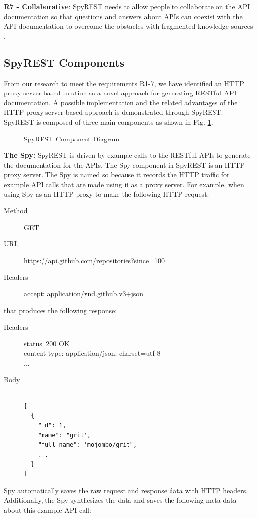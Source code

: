 \documentclass[conference]{IEEEtran}
\begin{document}
  \textbf{R7 - Collaborative}: SpyREST needs to allow people to collaborate on the API documentation so that questions and answers about APIs can coexist with the API documentation to overcome the obstacles with fragmented knowledge sources \cite{Chen_who_asked}.


\subsection{SpyREST Components} %
From our research to meet the requirements R1-7, we have identified an HTTP proxy server based solution as a novel approach for generating RESTful API documentation. A possible implementation and the related advantages of the HTTP proxy server based approach is demonstrated through SpyREST. SpyREST is composed of three main components as shown in Fig. \ref{fig:components}.

\begin{figure}[htb]
\centering
\def\svgwidth{\linewidth}

\caption{SpyREST Component Diagram}
\label{fig:components}
\end{figure}

\textbf{The Spy:} SpyREST is driven by example calls to the RESTful APIs to generate the documentation for the APIs. The Spy component in SpyREST is an HTTP proxy server. The Spy is named so because it records the HTTP traffic for example API calls that are made using it as a proxy server. For example, when using Spy as an HTTP proxy to make the following HTTP request:

\footnotesize
\begin{description}
  \item[Method] GET
  \item[URL] https://api.github.com/repositories?since=100
  \item[Headers] accept: application/vnd.github.v3+json
\end{description}
\normalsize
that produces the following response:
\footnotesize
\begin{description}
  \item[Headers] status: 200 OK \\
content-type: application/json; charset=utf-8 \\
...
  \item[Body]
\begin{lstlisting}

[
  {
    "id": 1,
    "name": "grit",
    "full_name": "mojombo/grit",
    ...
  }
]\end{lstlisting}
\end{description}
\normalsize
Spy automatically saves the raw request and response data with HTTP headers. Additionally, the Spy synthesizes the data and saves the following meta data about this example API call:
\end{document}
